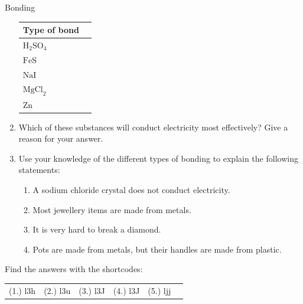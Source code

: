 \begin{exercises}{Bonding}
\begin{enumerate}[noitemsep, label=\textbf{\arabic*}. ]
\begin{table}[H]
\begin{center}
\begin{tabular}{|l|l|}
        \textbf{Type of bond} \\ \hline
        $\text{H}_{2}\text{SO}_{4}$ &
        \\ \hline
        $\text{FeS}$ &
        \\ \hline
        $\text{NaI}$ &
         \\ \hline
        $\text{MgCl}_{2}$ &
        \\ \hline
        $\text{Zn}$ &
       \\ \hline
    \end{tabular}
      \end{center}
\end{table}
    \par
\item Which of these substances will conduct electricity most effectively? Give a reason for your answer.
\item Use your knowledge of the different types of bonding to explain the following statements:
\begin{enumerate}[noitemsep, label=\textbf{\alph*}. ] 
\item A sodium chloride crystal does not conduct electricity.
\item Most jewellery items are made from metals.
\item It is very hard to break a diamond.
\item Pots are made from metals, but their handles are made from plastic.
\end{enumerate}
                \end{enumerate}
  \label{m38694**end}
\practiceinfo
\par {} Find the answers with the shortcodes:
 \par \begin{tabular}[h]{cccccc}
 (1.) l3h  &  (2.) l3u  &  (3.) l3J  &  (4.) l3J  &  (5.) ljj  & \end{tabular}
\end{exercises}
